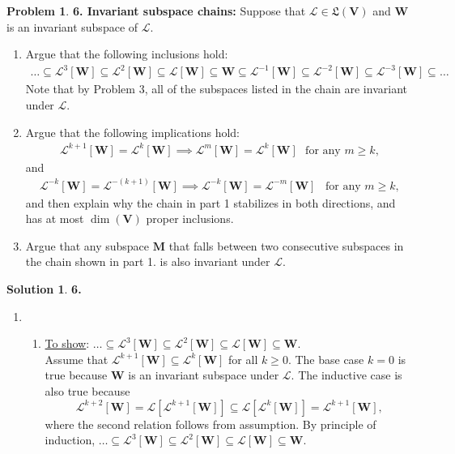 \documentclass{article}
\theoremstyle{definition}
\newtheorem*{prob*}{Problem}
\newtheorem*{sln*}{Solution}
\newcommand{\V}{\mathbf{V}}
\newcommand{\W}{\mathbf{W}}
\newcommand{\lag}{\mathcal{L}}
\begin{document}
\newpage

\begin{prob*}\textbf{6. Invariant subspace chains:} Suppose that $\lag \in \mathfrak{L}(\V)$ and $\W$ is an invariant subspace of $\lag$. 
	\begin{enumerate}
		\item Argue that the following inclusions hold:
		\begin{align*}
		\dots \subseteq \lag^3[\W] \subseteq \lag^2[\W]\subseteq \lag [\W] \subseteq \W \subseteq \lag^{-1}[\W] \subseteq \lag^{-2}[\W] \subseteq \lag^{-3}[\W]\subseteq\dots
		\end{align*}
		Note that by Problem 3, all of the subspaces listed in the chain are invariant under $\lag$.
		\item Argue that the following implications hold:
		\begin{align*}
		\lag^{k+1}[\W] = \lag^{k}[\W] \implies \lag^m[\W] = \lag^k[\W]\,\,\,\, \text{for any } m\geq k,
		\end{align*}
		and 
		\begin{align*}
		\lag^{-k}[\W] = \lag^{-(k+1)}[\W] \implies \lag^{-k}[\W] = \lag^{-m}[\W]\,\,\,\,\, \text{for any } m\geq k,
		\end{align*}
		and then explain why the chain in part 1 stabilizes in both directions, and has at most $\dim(\V)$ proper inclusions. 
		\item Argue that any subspace $\mathbf{M}$ that falls between two consecutive subspaces in the chain shown in part 1. is also invariant under $\lag$. 
		
		
	\end{enumerate}
	\begin{sln*}\textbf{6.}
		$\,$
		\begin{enumerate}
			\item 
			\begin{enumerate}
				\item \underline{To show}: $\dots \subseteq \lag^3[\W] \subseteq \lag^2[\W]\subseteq \lag [\W] \subseteq \W$.\\
				
				Assume that $ \lag^{k+1}[\W] \subseteq \lag^k[\W] $ for all $k\geq 0$. The base case $k=0$ is true because $\W$ is an invariant subspace under $\lag$. The inductive case is also true because $$ \lag^{k+2}[\W] = \lag[\lag^{k+1}[\W]] \subseteq \lag[\lag^k[\W]] = \lag^{k+1}[\W],$$ where the second relation follows from assumption. By principle of induction, $\dots \subseteq \lag^3[\W] \subseteq \lag^2[\W]\subseteq \lag [\W] \subseteq \W$.\\
				

\end{enumerate}
\end{enumerate}
\end{sln*}
\end{prob*}
\end{document}
